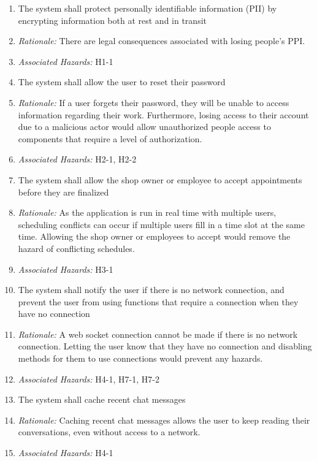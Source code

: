 \documentclass{article}
\begin{document}
\begin{enumerate}[label=SR\arabic*.]
	\item The system shall protect personally identifiable information (PII) by encrypting information both
	      at rest and in transit
	\item[] \emph{Rationale:} There are legal consequences associated with losing people's PPI.
	\item[] \emph{Associated Hazards:} H1-1 \\
	\item The system shall allow the user to reset their password
	\item[] \emph{Rationale:} If a user forgets their password, they will be unable to access information
		regarding their work. Furthermore, losing access to their account due to a malicious actor would
		allow unauthorized people access to components that require a level of authorization.
	\item[] \emph{Associated Hazards:} H2-1, H2-2 \\
	\item The system shall allow the shop owner or employee to accept appointments before they are finalized
	\item[] \emph{Rationale:} As the application is run in real time with multiple users, scheduling conflicts
		can occur if multiple users fill in a time slot at the same time. Allowing the shop owner or employees
		to accept would remove the hazard of conflicting schedules.
	\item[] \emph{Associated Hazards:} H3-1 \\
	\item The system shall notify the user if there is no network connection, and prevent the user from using
	      functions that require a connection when they have no connection
	\item[] \emph{Rationale:} A web socket connection cannot be made if there is no network connection.
		Letting the user know that they have no connection and disabling methods for them to use connections
		would prevent any hazards.
	\item[] \emph{Associated Hazards:} H4-1, H7-1, H7-2 \\
	\item The system shall cache recent chat messages
	\item[] \emph{Rationale:} Caching recent chat messages allows the user to keep reading their conversations,
		even without access to a network.
	\item[] \emph{Associated Hazards:} H4-1 \\

\end{enumerate}
\end{document}
